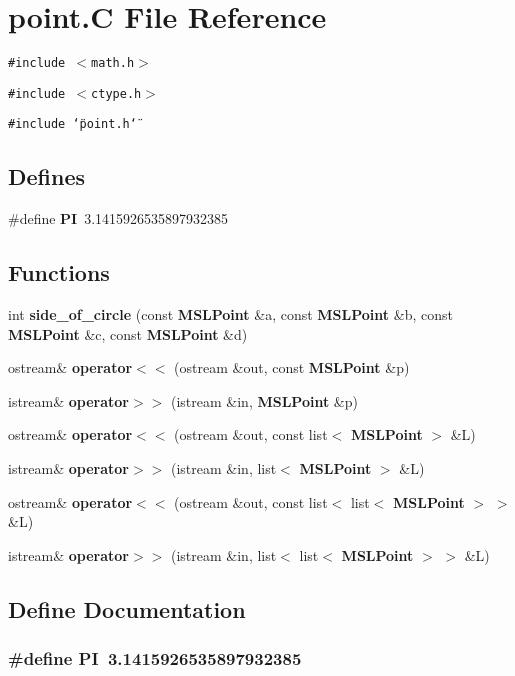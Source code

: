 \section{point.C File Reference}
\label{point_C}
{\tt \#include $<$math.h$>$}\par
{\tt \#include $<$ctype.h$>$}\par
{\tt \#include \char`\"{}point.h\char`\"{}}\par
\subsection*{Defines}
\begin{CompactItemize}
\item 
\#define {\bf PI}\ 3.1415926535897932385
\end{CompactItemize}
\subsection*{Functions}
\begin{CompactItemize}
\item 
int {\bf side\_\-of\_\-circle} (const {\bf MSLPoint} \&a, const {\bf MSLPoint} \&b, const {\bf MSLPoint} \&c, const {\bf MSLPoint} \&d)
\item 
ostream\& {\bf operator$<$$<$} (ostream \&out, const {\bf MSLPoint} \&p)
\item 
istream\& {\bf operator$>$$>$} (istream \&in, {\bf MSLPoint} \&p)
\item 
ostream\& {\bf operator$<$$<$} (ostream \&out, const list$<$ {\bf MSLPoint} $>$ \&L)
\item 
istream\& {\bf operator$>$$>$} (istream \&in, list$<$ {\bf MSLPoint} $>$ \&L)
\item 
ostream\& {\bf operator$<$$<$} (ostream \&out, const list$<$ list$<$ {\bf MSLPoint} $>$ $>$ \&L)
\item 
istream\& {\bf operator$>$$>$} (istream \&in, list$<$ list$<$ {\bf MSLPoint} $>$ $>$ \&L)
\end{CompactItemize}


\subsection{Define Documentation}
\subsubsection{\setlength{\rightskip}{0pt plus 5cm}\#define PI\ 3.1415926535897932385}\label{point_C_a0}




